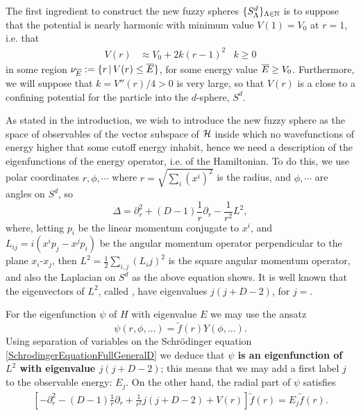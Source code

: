 The first ingredient to construct the new fuzzy spheres $\{S^d_\Lambda\}_{\Lambda \in \mathbb{N}}$ is to suppose that the potential is nearly harmonic with minimum value $V(1) = V_0$ at $r = 1$, i.e. that
\begin{align}\label{equationPotentialHarmonicGeneralD}
            V(r) &\approx V_0 + 2k(r-1)^2 & k \geq 0
    \end{align}
in some region $\nu_{\overline{E}} := \{r \,|\, V(r) \leq \overline{E}\}$, for some energy value $\overline{E} \geq V_0$. Furthermore, we will suppose that $k = V''(r)/4 > 0$ is very large, so that $V(r)$ is a close to a confining potential for the particle into the $d$-sphere, $S^d$.

\lin

As stated in the introduction, we wish to introduce the new fuzzy sphere as the space of observables of the vector subspace of $\mathcal H$ inside which no wavefunctions of energy higher that some cutoff energy inhabit, hence we need a description of the eigenfunctions of the energy operator, i.e. of the Hamiltonian. 
To do this, we use polar coordinates $r, \phi, \cdots$ where $r = \sqrt{\sum_i (x^i)^2}$ is the radius, and $\phi, \cdots$ are angles on $S^d$, so
\begin{equation}\label{LaplacianPolarCoordinatesGeneralD}
    \Delta = \partial_r^2 + (D-1)\frac{1}{r} \partial_r - \frac{1}{r^2} L^2,
\end{equation}
where, letting $p_i$ be the linear momentum conjugate to $x^i$, and $L_{ij} = i(x^i p_j - x^j p_i)$ be the angular momentum operator perpendicular to the plane $x_i$-$x_j$, then $L^2 = \frac{1}{2} \sum_{i, j} (L_ij)^2$ is the square angular momentum operator, and also the Laplacian on $S^d$ as the above equation shows. It is well known \cite{} that the eigenvectors of $L^2$, called , have eigenvalues $j(j+D-2)$, for $j = $. 

For the eigenfunction $\psi$ of $H$ with eigenvalue $E$  we may use the ansatz
\begin{equation}\label{ansatzSolutionEigenfunctionEigenvalueEnergyHamiltonianGeneralD}
    \psi(r, \phi, \dots) = \tilde f(r) Y(\phi, \dots).
\end{equation}
Using separation of variables on the Schr\"odinger equation \ref{SchrodingerEquationFullGeneralD} we deduce that \textbf{$\psi$ is an eigenfunction of $L^2$ with eigenvalue $j(j+D-2)$}; this means that we may add a first label $j$ to the observable energy: $E_j$. On the other hand, the radial part of $\psi$ satisfies
\begin{align}\label{equationRadialSchrodingerGeneralDPolarAngles}
        \left[-\partial_r^2 - (D-1) \frac{1}{r} \partial_r + \frac{1}{r^2} j(j+D-2) + V(r)\right] \tilde f(r) = E_j \tilde f(r).
\end{align}

